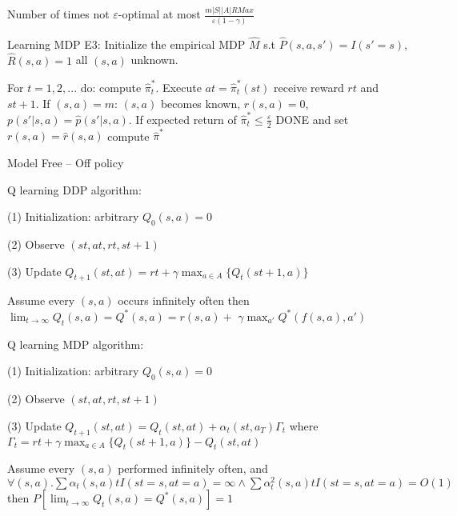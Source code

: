 \begin{clm}
Number of times not $\varepsilon$-optimal at most $\frac{m|S||A|RMax}{\varepsilon(1-\gamma)}$
\end{clm}

\begin{deff}
Learning MDP E3: Initialize the empirical MDP $\hat{M}$ s.t $\hat{P}(s, a, s') = I(s' = s)$, $\hat{R}(s, a) = 1$ all $(s, a)$ unknown.

For $t = 1,2, ...$ do: compute $\hat{\pi}_t^*$. Execute $at = \hat{\pi}_t^*(st)$ receive reward $rt$ and $st+1$. If $(s, a) = m$: $(s, a)$ becomes known, $r(s, a) = 0$, $p(s'|s, a) = \hat{p}(s'|s, a)$. If expected return of $\hat{\pi}_t^* \leq \frac{\varepsilon}{2}$ DONE and set $r(s, a) = \hat{r}(s, a)$ compute $\hat{\pi}^*$

Model Free – Off policy
\end{deff}

\begin{deff}
Q learning DDP algorithm: 

(1) Initialization: arbitrary $Q_0(s, a) = 0$ 

(2) Observe $(st, at, rt, st+1)$ 

(3) Update $Q_{t+1}(st, at) = rt + \gamma \max_{a \in A}\{Q_t(st+1, a)\}$
\end{deff}

\begin{thm}
Assume every $(s, a)$ occurs infinitely often then $\lim_{t \to \infty} Q_t(s, a) = Q^*(s, a) = r(s, a) +$
$ \gamma \max_{a'} Q^*(f(s, a), a')$
\end{thm}

\begin{deff}
Q learning MDP algorithm: 

(1) Initialization: arbitrary $Q_0(s, a) = 0$ 

(2) Observe $(st, at, rt, st+1)$ 

(3) Update $Q_{t+1}(st, at) = Q_t(st, at) + \alpha_t(st, a_T)\Gamma_t$ where $\Gamma_t = rt + \gamma \max_{a \in A}\{Q_t(st+1, a)\} - Q_t(st, at)$
\end{deff}

\begin{thm}
Assume every $(s, a)$ performed infinitely often, and $\forall(s, a). \sum \alpha_t(s, a) t I(st = s, at = a) = \infty \land \sum \alpha_t^2(s, a) t I(st = s, at = a) = O(1)$ then $P[\lim_{t \to \infty} Q_t(s, a) = Q^*(s, a)] = 1$
\end{thm}

